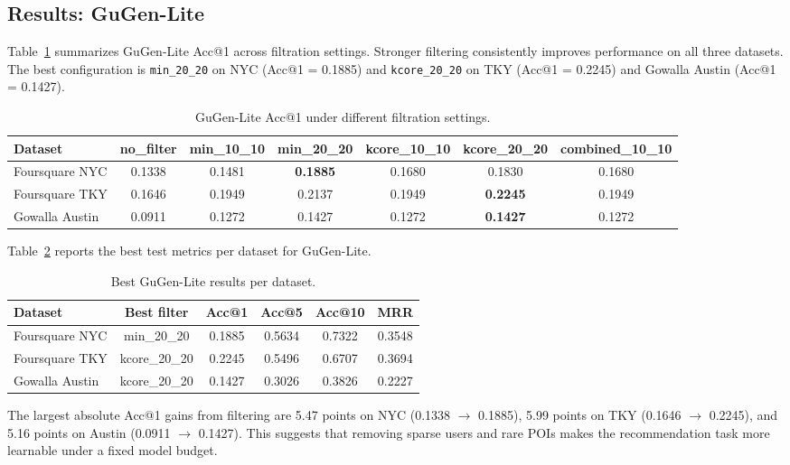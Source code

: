 \documentclass[12pt, journal]{IEEEtran}
\begin{document}
\subsection{Results: GuGen-Lite}

Table~\ref{tab:gugen_acc1} summarizes GuGen-Lite Acc@1 across filtration settings. Stronger filtering consistently improves performance on all three datasets. The best configuration is \texttt{min\_20\_20} on NYC (Acc@1 = 0.1885) and \texttt{kcore\_20\_20} on TKY (Acc@1 = 0.2245) and Gowalla Austin (Acc@1 = 0.1427).

\begin{table}[!t]
\centering
\caption{GuGen-Lite Acc@1 under different filtration settings.}
\label{tab:gugen_acc1}
\begin{tabular}{lcccccc}
\toprule
\textbf{Dataset} & \textbf{no\_filter} & \textbf{min\_10\_10} & \textbf{min\_20\_20} & \textbf{kcore\_10\_10} & \textbf{kcore\_20\_20} & \textbf{combined\_10\_10} \\
\midrule
Foursquare NYC & 0.1338 & 0.1481 & \textbf{0.1885} & 0.1680 & 0.1830 & 0.1680 \\
Foursquare TKY & 0.1646 & 0.1949 & 0.2137 & 0.1949 & \textbf{0.2245} & 0.1949 \\
Gowalla Austin & 0.0911 & 0.1272 & 0.1427 & 0.1272 & \textbf{0.1427} & 0.1272 \\
\bottomrule
\end{tabular}
\end{table}

Table~\ref{tab:gugen_best} reports the best test metrics per dataset for GuGen-Lite.

\begin{table}[!t]
\centering
\caption{Best GuGen-Lite results per dataset.}
\label{tab:gugen_best}
\begin{tabular}{lccccc}
\toprule
\textbf{Dataset} & \textbf{Best filter} & \textbf{Acc@1} & \textbf{Acc@5} & \textbf{Acc@10} & \textbf{MRR} \\
\midrule
Foursquare NYC & min\_20\_20 & 0.1885 & 0.5634 & 0.7322 & 0.3548 \\
Foursquare TKY & kcore\_20\_20 & 0.2245 & 0.5496 & 0.6707 & 0.3694 \\
Gowalla Austin & kcore\_20\_20 & 0.1427 & 0.3026 & 0.3826 & 0.2227 \\
\bottomrule
\end{tabular}
\end{table}

The largest absolute Acc@1 gains from filtering are 5.47 points on NYC (0.1338 $\rightarrow$ 0.1885), 5.99 points on TKY (0.1646 $\rightarrow$ 0.2245), and 5.16 points on Austin (0.0911 $\rightarrow$ 0.1427). This suggests that removing sparse users and rare POIs makes the recommendation task more learnable under a fixed model budget.
\end{document}
